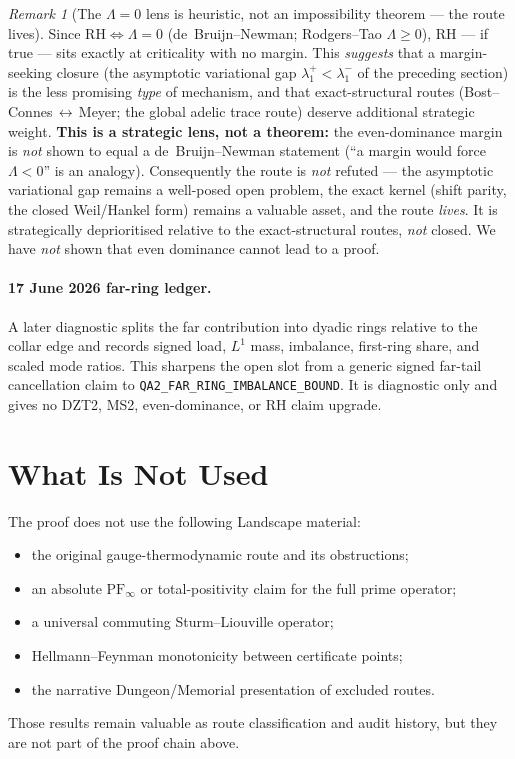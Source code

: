 \documentclass[11pt,a4paper]{article}
\theoremstyle{remark}
\newtheorem{remark}[remark]{Remark}
\theoremstyle{plain}
\begin{document}
\begin{remark}[The $\Lambda=0$ lens is heuristic, not an impossibility theorem --- the route lives]
Since $\mathrm{RH}\Leftrightarrow\Lambda=0$ (de~Bruijn--Newman; Rodgers--Tao
$\Lambda\ge 0$), RH --- if true --- sits exactly at criticality with no margin.
This \emph{suggests} that a margin-seeking closure (the asymptotic variational gap
$\lambda_1^+<\lambda_1^-$ of the preceding section) is the less promising
\emph{type} of mechanism, and that exact-structural routes
(Bost--Connes\,$\leftrightarrow$\,Meyer; the global adelic trace route) deserve
additional strategic weight. \textbf{This is a strategic lens, not a theorem:} the
even-dominance margin is \emph{not} shown to equal a de~Bruijn--Newman statement
(``a margin would force $\Lambda<0$'' is an analogy). Consequently the route is
\emph{not} refuted --- the asymptotic variational gap remains a well-posed open
problem, the exact kernel (shift parity, the closed Weil/Hankel form) remains a
valuable asset, and the route \emph{lives}. It is strategically deprioritised
relative to the exact-structural routes, \emph{not} closed. We have \emph{not}
shown that even dominance cannot lead to a proof.
\end{remark}

\paragraph{17 June 2026 far-ring ledger.}
A later diagnostic splits the far contribution into dyadic rings relative to
the collar edge and records signed load, $L^1$ mass, imbalance, first-ring
share, and scaled mode ratios. This sharpens the open slot from a generic
signed far-tail cancellation claim to
\texttt{QA2\_FAR\_RING\_IMBALANCE\_BOUND}. It is diagnostic only and gives no
DZT2, MS2, even-dominance, or RH claim upgrade.


\section{What Is Not Used}

The proof does not use the following Landscape material:
\begin{itemize}[leftmargin=*]
  \item the original gauge-thermodynamic route and its obstructions;
  \item an absolute $\mathrm{PF}_\infty$ or total-positivity claim for the full prime operator;
  \item a universal commuting Sturm--Liouville operator;
  \item Hellmann--Feynman monotonicity between certificate points;
  \item the narrative Dungeon/Memorial presentation of excluded routes.
\end{itemize}
Those results remain valuable as route classification and audit history, but
they are not part of the proof chain above.
\end{document}
